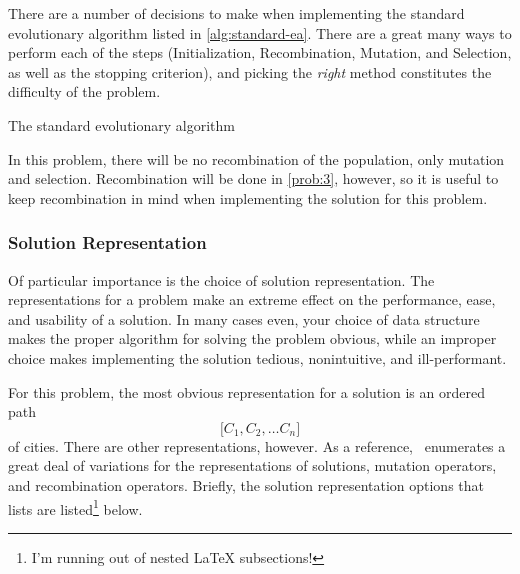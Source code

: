 \documentclass{article}
\begin{document}
There are a number of decisions to make when implementing the standard evolutionary algorithm
listed in \autoref{alg:standard-ea}. There are a great many ways to perform each of the steps
(Initialization, Recombination, Mutation, and Selection, as well as the stopping criterion), and
picking the \textit{right} method constitutes the difficulty of the problem.

\begin{algorithm}[h]
    \begin{algorithmic}
            \EndWhile{}
            \State{}
        \EndFunction{}
    \end{algorithmic}
    \caption{The standard evolutionary algorithm}\label{alg:standard-ea}
\end{algorithm}

In this problem, there will be no recombination of the population, only mutation and selection.
Recombination will be done in \autoref{prob:3}, however, so it is useful to keep recombination in
mind when implementing the solution for this problem.

\subsubsection{Solution Representation}
Of particular importance is the choice of solution representation. The representations for a
problem make an extreme effect on the performance, ease, and usability of a solution. In many cases
even, your choice of data structure makes the proper algorithm for solving the problem obvious,
while an improper choice makes implementing the solution tedious, nonintuitive, and ill-performant.

For this problem, the most obvious representation for a solution is an ordered path
\[\lbrack C_1, C_2, \dots C_n \rbrack \]
of cities. There are other representations, however. As a reference,~\cite{tsp_ea} enumerates a
great deal of variations for the representations of solutions, mutation operators, and
recombination operators. Briefly, the solution representation options that~\cite{tsp_ea} lists are
listed\footnote{I'm running out of nested \LaTeX{} subsections!} below.
\end{document}
